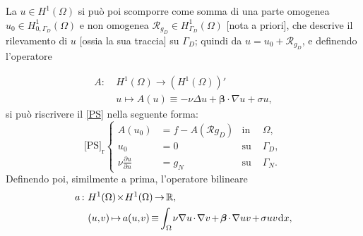 \documentclass{article}
\newcommand{\derP}[2]{\frac{\partial#1}{\partial#2}}
\newcommand{\de}{\mathrm{d}}
\newcommand{\SpaziaturaMate}[3]{
    \setlength{\thinmuskip}{#1mu}
    \setlength{\medmuskip}{#2mu}
    \setlength{\thickmuskip}{#3mu}
}
\newcommand{\teqref}[2]{\hyperref[#1]{#2}}
\begin{document}
            {\SpaziaturaMate{1}{2}{3}
               La $u\!\in\!H^1(\Omega)$ si può poi scomporre come somma di una parte omogenea $u_0\!\in\!H^1_{0,\Gamma_D}(\Omega)$ e non omogenea $\mathcal R_{g_D}\!\in\!H^1_{\Gamma_D}(\Omega)$ [nota a priori], che descrive il rilevamento di $u$ [ossia la sua traccia] su $\Gamma_D$; quindi da $u=u_0+\mathcal R_{g_D}$, e definendo l'operatore}
            \begin{equation*}
                \begin{aligned}
                    A:\ &H^1(\Omega)\rightarrow(H^1(\Omega))'\\
                    &u\mapsto A(u)\equiv-\nu\Delta u+\boldsymbol\beta\cdot\nabla u+\sigma u,
                \end{aligned}
                \label{eqOperatorePS}
            \end{equation*}
            si può riscrivere il \teqref{eqProblemaStazionario}{[PS]} nella seguente forma: 
            \begin{equation}
                \text{[PS]}_\text{r}
                \left\{
                \begin{aligned}
                    A(u_0)&=f-A(\mathcal Rg_D)&\text{in }&\Omega,\\
                              u_0&=0 &\text{su }&\Gamma_D,\\
                    \nu\derP un&=g_N &\text{su }&\Gamma_N. 
                \end{aligned}
                \right.
                \label{eqPSRiformulato}
            \end{equation}
            Definendo poi, similmente a prima, l'operatore bilineare
            \begin{equation}
                \setlength{\thinmuskip}{1mu}
                \setlength{\medmuskip}{2mu}
                \setlength{\thickmuskip}{3mu}
                \begin{aligned}
                    a:\ &H^1(\Omega)\!\times\!H^1(\Omega)
                    \rightarrow\mathbb R,\\
                    &(u,v)\mapsto a(u,v)\equiv
                    \int_{\Omega}\nu\nabla u\cdot\nabla v
                    +\boldsymbol\beta\cdot\nabla uv
                    +\sigma uv \,\de x,
                \end{aligned}
                \label{eqOperatoreBilinearePSVariazionale}
            \end{equation}
\end{document}
